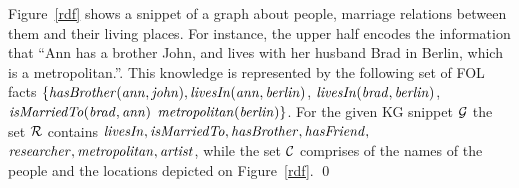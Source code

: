 \begin{example} Figure~\ref{rdf} shows a snippet of a graph about people, marriage %
relations between them %
and  their %
living places. For instance, the upper half encodes the information that ``Ann has a brother John, and lives with her husband Brad in Berlin, which is a metropolitan.''. 
This knowledge is %
represented by the following set of FOL facts $\mathit{\{hasBrother(ann, john), livesIn(ann, berlin)}$, $\mathit{livesIn(brad, berlin)}$, $\mathit{isMarriedTo(brad, ann)}$
$\mathit{metropolitan(berlin)}\}$. For the given KG snippet $\mathcal{G}$ the set $\mathcal{R}$ contains $\mathit{livesIn,isMarriedTo,hasBrother,hasFriend,}$\\$\mathit{researcher,metropolitan,artist}$, while the set $\mathcal{C}$ comprises of the names of the people and the locations depicted on Figure~\ref{rdf}. \qed
\end{example}






